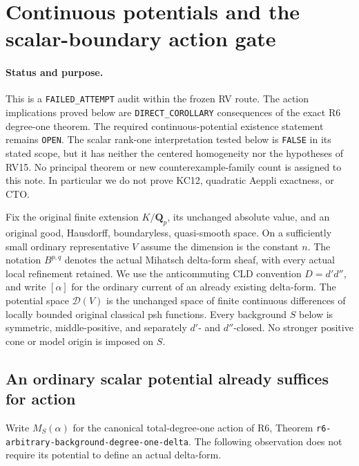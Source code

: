 \section{Continuous potentials and the scalar-boundary action gate}
\label{sec:r24-scalar-boundary-action}

\paragraph{Status and purpose.}
This is a \texttt{FAILED\_ATTEMPT} audit within the frozen RV route.
The action implications proved below are \texttt{DIRECT\_COROLLARY}
consequences of the exact R6 degree-one theorem.  The required
continuous-potential existence statement remains \texttt{OPEN}.
The scalar rank-one interpretation tested below is \texttt{FALSE}
in its stated scope, but it has neither the centered homogeneity
nor the hypotheses of RV15.  No principal theorem or new
counterexample-family count is assigned to this note.  In particular
we do not prove KC12, quadratic Aeppli exactness, or CTO.

Fix the original finite extension \(K/\mathbf Q_p\), its unchanged
absolute value, and an original good, Hausdorff, boundaryless,
quasi-smooth space.  On a sufficiently small ordinary representative
\(V\) assume the dimension is the constant \(n\).
The notation \(B^{p,q}\) denotes the actual Mihatsch delta-form
sheaf, with every actual local refinement retained.  We use the
anticommuting CLD convention \(D=d'd''\), and write \([\alpha]\)
for the ordinary current of an already existing delta-form.
The potential space \(\mathcal D(V)\) is the unchanged space of
finite continuous differences of locally bounded original classical
psh functions.  Every background \(S\) below is symmetric,
middle-positive, and separately \(d'\)- and \(d''\)-closed.
No stronger positive cone or model origin is imposed on \(S\).

\subsection{An ordinary scalar potential already suffices for action}

Write \(M_S(\alpha)\) for the canonical total-degree-one action
of R6, Theorem \texttt{r6-arbitrary-background-degree-one-delta}.
The following observation does not require its potential to define
an actual delta-form.


